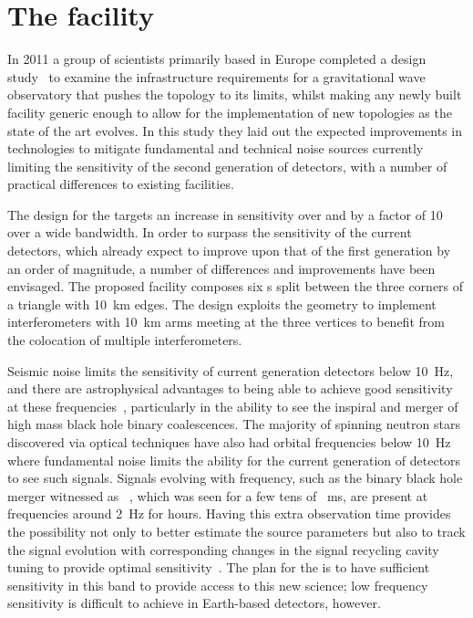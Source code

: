 \section{The \ET{} facility}
In 2011 a group of scientists primarily based in Europe completed a design study~\cite{ET2011} to examine the infrastructure requirements for a gravitational wave observatory that pushes the \MI{} topology to its limits, whilst making any newly built facility generic enough to allow for the implementation of new topologies as the state of the art evolves. In this study they laid out the expected improvements in technologies to mitigate fundamental and technical noise sources currently limiting the sensitivity of the second generation of detectors, with a number of practical differences to existing facilities.

The design for the \ET{} targets an increase in sensitivity over \ALIGO{} and \AVIRGO{} by a factor of \num{10} over a wide bandwidth. In order to surpass the sensitivity of the current detectors, which already expect to improve upon that of the first generation by an order of magnitude, a number of differences and improvements have been envisaged. The proposed \ET{} facility composes six \DRFPMI{}s split between the three corners of a triangle with \SI{10}{\kilo\meter} edges. The design exploits the geometry to implement interferometers with \SI{10}{\kilo\meter} arms meeting at the three vertices to benefit from the colocation of multiple interferometers.

Seismic noise limits the sensitivity of current generation detectors below \SI{10}{\hertz}, and there are astrophysical advantages to being able to achieve good sensitivity at these frequencies~\cite{Sathyaprakash2012}, particularly in the ability to see the inspiral and merger of high mass black hole binary coalescences. The majority of spinning neutron stars discovered via optical techniques have also had orbital frequencies below \SI{10}{\hertz} where fundamental noise limits the ability for the current generation of detectors to see such signals. Signals evolving with frequency, such as the binary black hole merger witnessed as \GWFIRSTEVENT{}~\cite{Abbott2016}, which was seen for a few tens of \SI{}{\milli\second}, are present at frequencies around \SI{2}{\hertz} for hours. Having this extra observation time provides the possibility not only to better estimate the source parameters but also to track the signal evolution with corresponding changes in the signal recycling cavity tuning to provide optimal sensitivity~\cite{Heinzel2002, Simakov2014}. The plan for the \ET{} is to have sufficient sensitivity in this band to provide access to this new science; low frequency sensitivity is difficult to achieve in Earth-based detectors, however.

